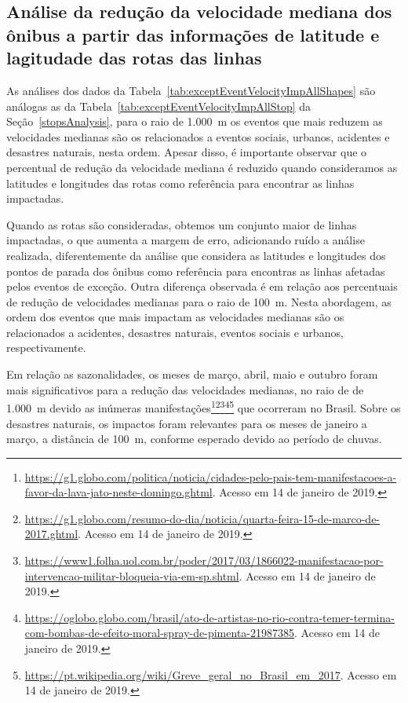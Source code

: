 \documentclass[
	12pt,				%
	oneside,			%
	a4paper,			%
	english,			%
	brazil				%
	]{abntex2ppgsi}
\begin{document}
{{{\subsection*{Análise da redução da velocidade mediana dos ônibus a partir das informações de latitude e lagitudade das rotas das linhas}

As análises dos dados da Tabela~\ref{tab:exceptEventVelocityImpAllShapes} são análogas  as da Tabela~\ref{tab:exceptEventVelocityImpAllStop} da Seção~\ref{stopsAnalysis}, para o raio de 1.000~m os eventos que mais reduzem as velocidades medianas são os relacionados a eventos sociais, urbanos, acidentes e desastres naturais, nesta ordem. Apesar disso, é importante observar que o percentual de redução da velocidade mediana é reduzido quando consideramos as latitudes e longitudes das rotas como referência  para encontrar as linhas impactadas.

Quando as rotas são consideradas, obtemos um conjunto maior de linhas impactadas, o que aumenta a margem de erro, adicionando ruído a análise realizada, diferentemente da análise que considera as latitudes e longitudes dos pontos de parada dos ônibus como referência para encontras as linhas afetadas pelos eventos de exceção. Outra diferença observada é em relação aos percentuais de redução de velocidades medianas para o raio de 100~m. Nesta abordagem, as ordem dos eventos que mais impactam as velocidades medianas são os relacionados a acidentes, desastres naturais, eventos sociais e urbanos, respectivamente.

Em relação as sazonalidades, os meses de  março, abril, maio e outubro foram mais significativos para a redução das velocidades medianas, no raio de de 1.000~m devido as inúmeras manifestações\footnote{\url{https://g1.globo.com/politica/noticia/cidades-pelo-pais-tem-manifestacoes-a-favor-da-lava-jato-neste-domingo.ghtml}. Acesso em 14 de janeiro de 2019.}\footnote{\url{https://g1.globo.com/resumo-do-dia/noticia/quarta-feira-15-de-marco-de-2017.ghtml}. Acesso em 14 de janeiro de 2019.}\footnote{\url{https://www1.folha.uol.com.br/poder/2017/03/1866022-manifestacao-por-intervencao-militar-bloqueia-via-em-sp.shtml}. Acesso em 14 de janeiro de 2019.}\footnote{\url{https://oglobo.globo.com/brasil/ato-de-artistas-no-rio-contra-temer-termina-com-bombas-de-efeito-moral-spray-de-pimenta-21987385}. Acesso em 14 de janeiro de 2019.}\footnote{\url{https://pt.wikipedia.org/wiki/Greve\_geral\_no\_Brasil\_em\_2017}. Acesso em 14 de janeiro de 2019.} que ocorreram no Brasil. Sobre os desastres naturais, os impactos foram relevantes para os meses de janeiro a março, a distância de 100~m, conforme esperado devido ao período de chuvas.

}}}
\end{document}
